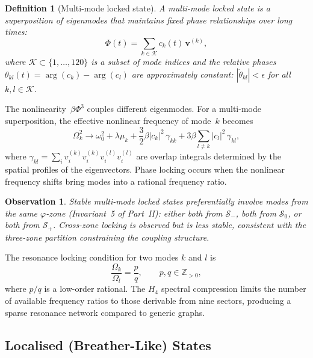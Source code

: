 \documentclass[12pt,a4paper]{article}
\newcommand{\Hfour}{H_4}
\newcommand{\vphi}{\varphi}
\newcommand{\Z}{\mathbb{Z}}
\newtheorem{definition}{Definition}
\newtheorem{observation}{Observation}
\begin{document}
\begin{definition}[Multi-mode locked state]
A multi-mode locked state is a superposition of eigenmodes that
maintains fixed phase relationships over long times:
\begin{equation}\label{eq:multi}
  \Phi(t) = \sum_{k \in \mathcal{K}} c_k(t) \, \mathbf{v}^{(k)},
\end{equation}
where $\mathcal{K} \subset \{1, \ldots, 120\}$ is a subset of mode
indices and the relative phases $\theta_{kl}(t) = \arg(c_k) - \arg(c_l)$
are approximately constant: $|\dot{\theta}_{kl}| < \epsilon$ for all
$k, l \in \mathcal{K}$.
\end{definition}

The nonlinearity~$\beta \Phi^3$ couples different eigenmodes.  For a
multi-mode superposition, the effective nonlinear frequency of mode~$k$
becomes
\begin{equation}\label{eq:freq_shift_multi}
  \Omega_k^2 \to \omega_0^2 + \lambda \mu_k
  + \frac{3}{2} \beta |c_k|^2 \, \gamma_{kk}
  + 3\beta \sum_{l \neq k} |c_l|^2 \, \gamma_{kl},
\end{equation}
where $\gamma_{kl} = \sum_i v_i^{(k)} v_i^{(k)} v_i^{(l)} v_i^{(l)}$
are overlap integrals determined by the spatial profiles of the
eigenvectors.  Phase locking occurs when the nonlinear frequency shifts
bring modes into a rational frequency ratio.

\begin{observation}
Stable multi-mode locked states preferentially involve modes from the
same $\vphi$-zone (Invariant~5 of Part~II): either both from
$\mathcal{S}_-$, both from $\mathcal{S}_0$, or both from
$\mathcal{S}_+$.  Cross-zone locking is observed but is less stable,
consistent with the three-zone partition constraining the coupling
structure.
\end{observation}

The resonance locking condition for two modes $k$ and $l$ is
\begin{equation}\label{eq:lock}
  \frac{\Omega_k}{\Omega_l} = \frac{p}{q}, \qquad p, q \in \Z_{>0},
\end{equation}
where $p/q$ is a low-order rational.  The $\Hfour$ spectral compression
limits the number of available frequency ratios to those derivable from
nine sectors, producing a sparse resonance network compared to generic
graphs.

\subsection{Localised (Breather-Like) States}\label{sec:breather}
\end{document}
